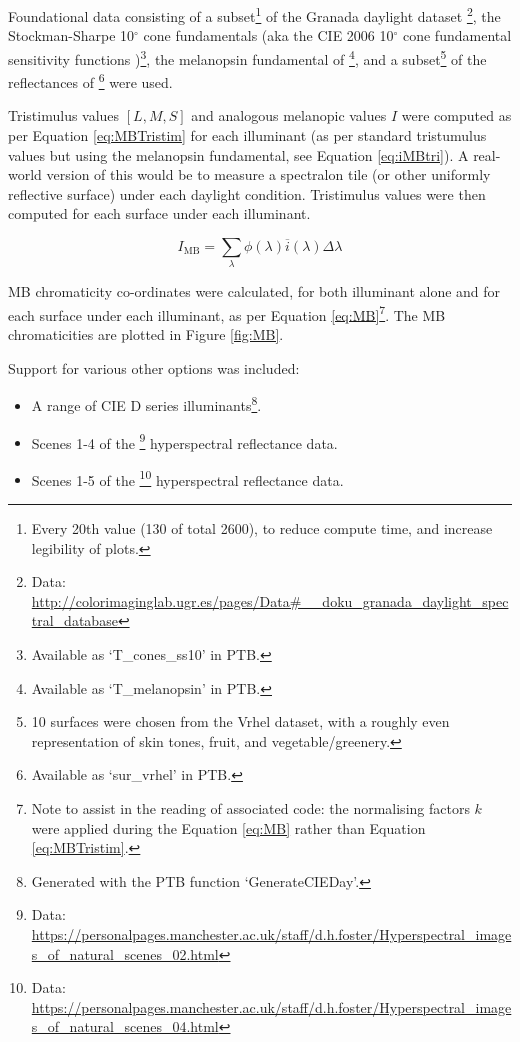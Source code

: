 Foundational data consisting of 
a subset\footnote{Every 20th value (130 of total 2600), to reduce compute time, and increase legibility of plots.} of the Granada daylight dataset 
\citep{hernandez-andres_color_2001}\footnote{Data: \url{http://colorimaginglab.ugr.es/pages/Data\#__doku_granada_daylight_spectral_database}},
the Stockman-Sharpe 10$^{\circ}$ cone fundamentals 
\citep{stockman_spectral_2000,stockman_spectral_1999}
(aka the CIE 2006 10$^{\circ}$ cone fundamental sensitivity functions \cite{cie_cie_2006})\footnote{Available as `T\_cones\_ss10' in \gls{PTB}.},
the melanopsin fundamental of \citet{lucas_measuring_2014}\footnote{Available as `T\_melanopsin' in \gls{PTB}.},
and a subset\footnote{10 surfaces were chosen from the Vrhel dataset, with a roughly even representation of skin tones, fruit, and vegetable/greenery.} 
of the reflectances of \citet{vrhel_measurement_1994}\footnote{Available as `sur\_vrhel' in \gls{PTB}.}
were used.

Tristimulus values $[L,M,S]$ and analogous melanopic values $I$ were computed as per Equation \ref{eq:MBTristim} for each illuminant (as per standard tristumulus values but using the melanopsin fundamental, see Equation \ref{eq:iMBtri}). A real-world version of this would be to measure a spectralon tile (or other uniformly reflective surface) under each daylight condition. Tristimulus values were then computed for each surface under each illuminant.

\begin{equation}
    I_{\text{MB}}=\sum_{\lambda} \phi(\lambda) \overline{i}(\lambda) \Delta \lambda
    \label{eq:iMBtri}
\end{equation}

\gls{MB} chromaticity co-ordinates were calculated, for both illuminant alone and for each surface under each illuminant, as per Equation \ref{eq:MB}\footnote{Note to assist in the reading of associated code: the normalising factors $k$ were applied during the Equation \ref{eq:MB} rather than Equation \ref{eq:MBTristim}.}. The \gls{MB} chromaticities are plotted in Figure \ref{fig:MB}. 

\bigskip
\noindent
Support for various other options was included:
\begin{itemize}
    \item A range of CIE D series illuminants\footnote{Generated with the \gls{PTB} function `GenerateCIEDay'.}.
    \item Scenes 1-4 of the
\citet{nascimento_statistics_2002}\footnote{Data: \url{https://personalpages.manchester.ac.uk/staff/d.h.foster/Hyperspectral_images_of_natural_scenes_02.html}} hyperspectral reflectance data.
    \item Scenes 1-5 of the 
\citet{foster_frequency_2006}\footnote{Data: \url{https://personalpages.manchester.ac.uk/staff/d.h.foster/Hyperspectral_images_of_natural_scenes_04.html}}
hyperspectral reflectance data.
\end{itemize}

